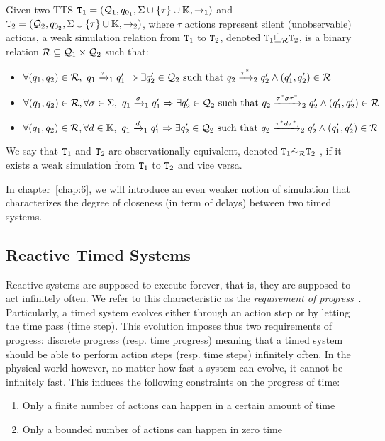 \begin{definition}\label{def:wsim}
  Given two TTS $\texttt{T}_{1}=(\mathcal{Q}_{1},q_{0_{1}},\Sigma \cup\{\tau\}\cup\mathbb{K},\to_{1})$ and $\texttt{T}_{2}=(\mathcal{Q}_{2},q_{0_{2}},\Sigma \cup\{\tau\}\cup\mathbb{K},\to_{2})$, where $\tau$ actions 
  represent silent (unobservable) actions, a weak simulation relation from 
  $\texttt{T}_{1}$ to $\texttt{T}_{2}$, denoted $\texttt{T}_{1}\dot{\sqsubseteq}_{\mathcal{R}}\texttt{T}_{2}$, 
  is a binary relation $\mathcal{R}\subseteq\mathcal{Q}_1
  \times\mathcal{Q}_2$ such that:
  \begin{itemize}
    \item $\forall(q_1,q_2)\in\mc{R},\ 
      q_1\transitb{\tau}{1}q_1'\Rightarrow\exists q'_2\in\mc{Q}_2 
      \text{ such that } q_2\transitb{\tau^*}{2}q_2'\wedge
      (q_1',q_2')\in\mc{R}$
    \item $\forall(q_1,q_2)\in\mc{R},\forall\sigma\in\Sigma,\ 
      q_1\transitb{\sigma}{1}q_1'\Rightarrow\exists q'_2\in\mc{Q}_2 
      \text{ such that } q_2\transitb{\tau^*\sigma\tau^*}{2}q_2'\wedge
      (q_1',q_2')\in\mc{R}$
    \item $\forall(q_1,q_2)\in\mc{R},\forall d\in\mb{K},\ 
      q_1\transitb{d}{1}q_1'\Rightarrow\exists q'_2\in\mc{Q}_2 
      \text{ such that } q_2\transitb{\tau^*d\tau^*}{2}q_2'\wedge
      (q_1',q_2')\in\mc{R}$
  \end{itemize}
\end{definition}
  We say that $\texttt{T}_{1}$ and $\texttt{T}_{2}$ are observationally equivalent,
  denoted $\texttt{T}_{1}\dot{\sim}_{\mathcal{R}}\texttt{T}_{2}$ , if it exists a weak simulation 
  from $\texttt{T}_{1}$ to $\texttt{T}_{2}$ and vice versa.
  
  In chapter~\ref{chap:6}, we will introduce an even weaker notion of simulation 
  that characterizes the degree of closeness (in term of delays)
  between two timed systems. 

\subsection{Reactive Timed Systems}
Reactive systems are supposed to execute forever, that is,
they are supposed to act infinitely often. We refer to this characteristic as 
the \emph{requirement of progress}~\cite{progress}. 
Particularly, a timed system evolves either through an action step or 
by letting the time pass (time step).
This evolution imposes thus two requirements of progress:
discrete progress (resp. time progress) meaning that a timed system
should be able to perform action steps (resp. time steps) infinitely
often. In the physical world however, no matter how fast a system can
evolve, it cannot be infinitely fast. This induces the following constraints
on the progress of time:
\begin{enumerate}
  \item Only a finite number of actions can happen in a certain amount of time
  \item Only a bounded number of actions can happen in zero time
\end{enumerate}

